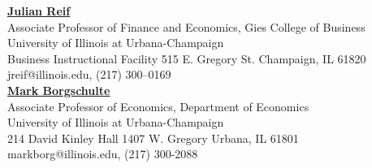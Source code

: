 \documentclass[a4paper,9pt]{extarticle}
\begin{document}
\noindent
\textbf{\href{https://julianreif.com}{Julian Reif}} \\
Associate Professor of Finance and Economics, Gies College of Business \\
University of Illinois at Urbana-Champaign \\
Business Instructional Facility 515 E. Gregory St.
Champaign, IL 61820\\
jreif@illinois.edu, (217) 300–0169 \\

\noindent
\textbf{\href{https://sites.google.com/site/markborgschulte/home}{Mark Borgschulte}} \\
Associate Professor of Economics, Department of Economics \\
University of Illinois at Urbana-Champaign \\
214 David Kinley Hall
1407 W. Gregory
Urbana, IL  61801\\
markborg@illinois.edu, (217) 300-2088 \\
\end{document}
